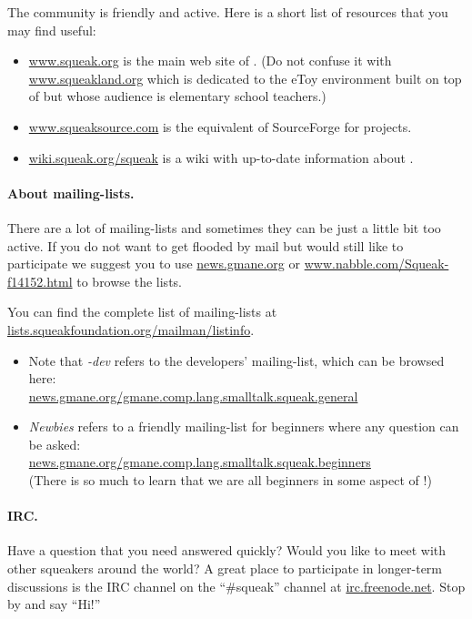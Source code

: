 \documentclass[a4paper,10pt,twoside]{book}
\begin{document}
The \squeak community is friendly and active.
Here is a short list of resources that you may find useful:

\begin{itemize}
\item \url{www.squeak.org} is the main web site of \squeak. (Do not confuse it with \url{www.squeakland.org} which is dedicated to the eToy environment built on top of \squeak but whose audience is elementary school teachers.)

\item \url{www.squeaksource.com} is the equivalent of SourceForge for \squeak projects.

\item \url{wiki.squeak.org/squeak} is a wiki with up-to-date information about \squeak.
\end{itemize}

\paragraph{About mailing-lists.} There are a lot of mailing-lists and sometimes they can be just a little bit too active. If you do not want to get flooded by mail but would still like to participate we suggest you to use \url{news.gmane.org} or \url{www.nabble.com/Squeak-f14152.html} to browse the lists.

You can find the complete list of \squeak mailing-lists at \url{lists.squeakfoundation.org/mailman/listinfo}.

\begin{itemize}
\item Note that \emph{\squeak-dev} refers to the developers' mailing-list, which can be browsed here:\\
\url{news.gmane.org/gmane.comp.lang.smalltalk.squeak.general}
\item \emph{Newbies} refers to a friendly mailing-list for beginners where any question can be asked:\\
\url{news.gmane.org/gmane.comp.lang.smalltalk.squeak.beginners}\\
(There is so much to learn that we are all beginners in some aspect of \squeak!)
\end{itemize}

\paragraph{IRC.}
Have a question that you need answered quickly? Would you like to meet with other squeakers around the world? A great place to participate in longer-term discussions is the IRC channel on the ``\#squeak'' channel at \url{irc.freenode.net}. Stop by and say ``Hi!''
\end{document}
